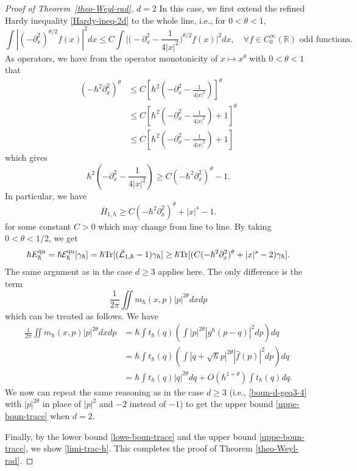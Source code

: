 \documentclass[%
11pt,  reqno]{amsart}
\theoremstyle{remarkstyle}
\newcommand{\1}{\hspace{0.2mm}\text{I}\hspace{0.2mm}}
\newcommand{\R}{\mathbb{R}}
\renewcommand{\L}{\mathcal{L}}
\DeclareMathOperator*{\qua}{qu}
\numberwithin{equation}{section}
\numberwithin{theorem}{section}
\begin{document}
\begin{proof}[Proof of Theorem~\ref{theo-Weyl-rad}]
		$\boxed{d=2}$ In this case, we first extend the refined Hardy inequality \eqref{Hardy-ineq-2d} to the whole line, i.e., for $0<\theta<1$,
		\[
		\int |(-\partial^2_x)^{\theta/2} f(x)|^2 dx \leq C \int\Big|\Big(-\partial^2_x -\frac{1}{4|x|^2}\Big)^{\theta/2}f(x)\Big|^2 dx, \quad \forall f \in C^\infty_0(\R) \text{ odd functions}.
		\]
		As operators, we have from the operator monotonicity of $x\mapsto x^\theta$ with $0<\theta<1$ that
		\begin{align*}
			(-\hbar^2\partial^2_x)^\theta &\leq C \left[\hbar^2\left(-\partial^2_x -\frac{1}{4|x|^2}\right)\right]^\theta \\
			&\leq C \left[ \hbar^2\left(-\partial^2_x -\frac{1}{4|x|^2}\right) +1\right]^\theta\\
			&\leq C \left[\hbar^2\left(-\partial^2_x -\frac{1}{4|x|^2}\right) +1 \right]
		\end{align*}
		which gives
		\[
		\hbar^2 \left(-\partial^2_x -\frac{1}{4|x|^2}\right) \geq C(-\hbar^2\partial^2_x)^\theta -1.
		\]
		In particular, we have
		\[
		\bar{H}_{1,\hbar} \geq C(-\hbar^2\partial^2_x)^\theta +|x|^s -1.
		\]
		for some constant $C>0$ which may change from line to line. By taking $0<\theta<1/2$, we get
		\begin{align} \label{uppe-boun-2d-1}
			\hbar E^{\qua}_{\hbar} =\hbar \mathcal E^{\qua}_{\hbar}[\gamma_{\hbar}] = \hbar {\rm Tr}[(\bar{\L}_{1,\hbar}-1)\gamma_{\hbar}] \geq \hbar {\rm Tr}[ (C(-\hbar^2\partial^2_x)^\theta +|x|^s-2)\gamma_\hbar].
		\end{align}
		The same argument as in the case $d\geq 3$ applies here. The only difference is the term
		\[
		\frac{1}{2\pi}\iint m_{\hbar}(x,p) |p|^{2\theta} dxdp
		\]
		which can be treated as follows. We have
		\begin{align*}
			\frac{1}{2\pi}\iint m_{\hbar}(x,p) |p|^{2\theta} dxdp	%
			&=\hbar \int t_\hbar(q) \left(\int |p|^{2\theta} |g^{\hbar}(p-q)|^2 dp \right) dq \\
			&=\hbar \int t_\hbar (q) \left(\int |q+\sqrt{\hbar} p|^{2\theta} |\hat{f}(p)|^2 dp \right) dq \\
			&= \hbar \int t_\hbar(q) |q|^{2\theta} dq + O(\hbar^{1+\theta}) \int t_{\hbar}(q)dq.
		\end{align*}
		We now can repeat the same reasoning as in the case $d\geq 3$ (i.e., \eqref{boun-d-geq3-4} with $|p|^{2\theta}$ in place of $|p|^2$ and $-2$ instead of $-1$) to get the upper bound \eqref{uppe-boun-trace} when $d=2$. 
		
		Finally, by the lower bound \eqref{lowe-boun-trace} and the upper bound \eqref{uppe-boun-trace}, we show \eqref{limi-trac-h}. This completes the proof of Theorem \ref{theo-Weyl-rad}.
	\end{proof}
	
\end{document}
